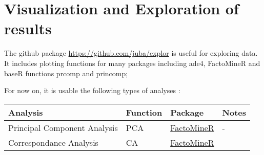 \documentclass[]{article}
\begin{document}
\hypertarget{visualization-and-exploration-of-results}{%
\section{Visualization and Exploration of
results}\label{visualization-and-exploration-of-results}}

The github package \url{https://github.com/juba/explor} is useful for
exploring data. It includes plotting functions for many packages
including ade4, FactoMineR and baseR functions prcomp and princomp;

For now on, it is usable the following types of analyses :

\begin{longtable}[]{@{}llll@{}}
\toprule
\begin{minipage}[b]{0.17\columnwidth}\raggedright
Analysis\strut
\end{minipage} & \begin{minipage}[b]{0.17\columnwidth}\raggedright
Function\strut
\end{minipage} & \begin{minipage}[b]{0.14\columnwidth}\raggedright
Package\strut
\end{minipage} & \begin{minipage}[b]{0.11\columnwidth}\raggedright
Notes\strut
\end{minipage}\tabularnewline
\midrule
\endhead
\begin{minipage}[t]{0.17\columnwidth}\raggedright
Principal Component Analysis\strut
\end{minipage} & \begin{minipage}[t]{0.17\columnwidth}\raggedright
PCA\strut
\end{minipage} & \begin{minipage}[t]{0.14\columnwidth}\raggedright
\href{http://factominer.free.fr/}{FactoMineR}\strut
\end{minipage} & \begin{minipage}[t]{0.11\columnwidth}\raggedright
-\strut
\end{minipage}\tabularnewline
\begin{minipage}[t]{0.17\columnwidth}\raggedright
Correspondance Analysis\strut
\end{minipage} & \begin{minipage}[t]{0.17\columnwidth}\raggedright
CA\strut
\end{minipage} & \begin{minipage}[t]{0.14\columnwidth}\raggedright
\href{http://factominer.free.fr/}{FactoMineR}\strut

\end{minipage}
\end{longtable}
\end{document}
